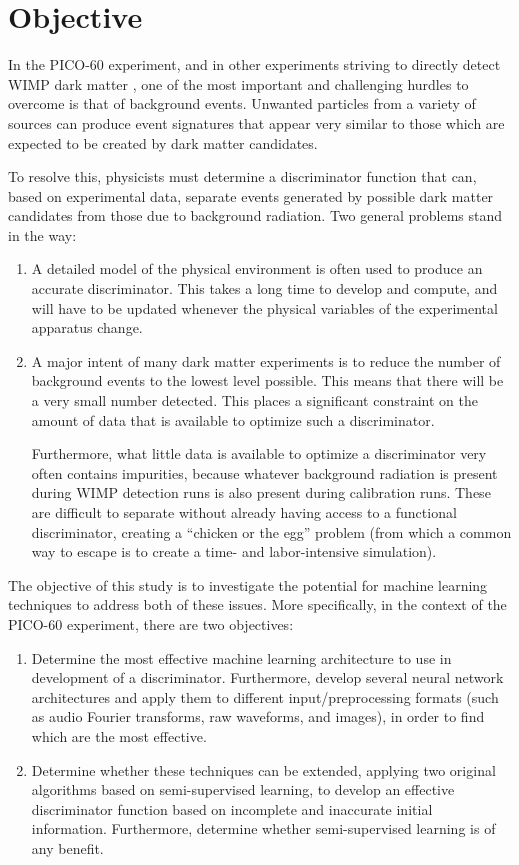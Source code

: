 \documentclass[10pt]{article}
\begin{document}
\section{Objective} \label{objective}

In the PICO-60 \cite{pico} experiment, and in other experiments striving to directly detect WIMP dark matter \cite{wimp}, one of the most important and challenging hurdles to overcome is that of background events. Unwanted particles from a variety of sources can produce event signatures that appear very similar to those which are expected to be created by dark matter candidates.

To resolve this, physicists must determine a discriminator function that can, based on experimental data, separate events generated by possible dark matter candidates from those due to background radiation. Two general problems stand in the way:

\begin{enumerate}
    \item A detailed model of the physical environment is often used to produce an accurate discriminator. This takes a long time to develop and compute, and will have to be updated whenever the physical variables of the experimental apparatus change.

    \item A major intent of many dark matter experiments is to reduce the number of background events to the lowest level possible. This means that there will be a very small number detected. This places a significant constraint on the amount of data that is available to optimize such a discriminator.

    Furthermore, what little data is available to optimize a discriminator very often contains impurities, because whatever background radiation is present during WIMP detection runs is also present during calibration runs. These are difficult to separate without already having access to a functional discriminator, creating a ``chicken or the egg'' problem (from which a common way to escape is to create a time- and labor-intensive simulation).
\end{enumerate}

The objective of this study is to investigate the potential for machine learning techniques to address both of these issues. More specifically, in the context of the PICO-60 experiment, there are two objectives:

\begin{enumerate}
    \item Determine the most effective machine learning architecture to use in development of a discriminator. Furthermore, develop several neural network architectures and apply them to different input/preprocessing formats (such as audio Fourier transforms, raw waveforms, and images), in order to find which are the most effective.
    \item Determine whether these techniques can be extended, applying two original algorithms based on semi-supervised learning, to develop an effective discriminator function based on incomplete and inaccurate initial information. Furthermore, determine whether semi-supervised learning is of any benefit.
\end{enumerate}
\end{document}
